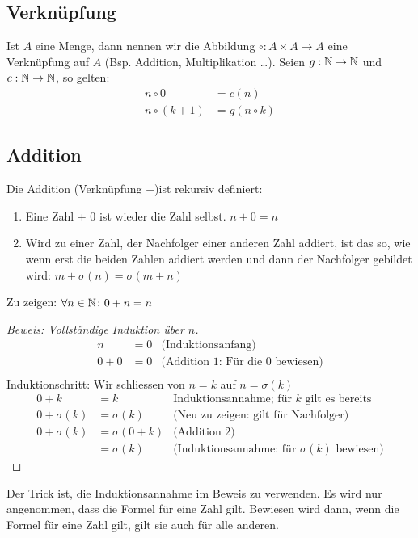 \subsection{Verknüpfung}
Ist $A$ eine Menge, dann nennen wir die Abbildung $\circ: A \times A \to A$ eine Verknüpfung auf $A$ (Bsp. Addition, Multiplikation \dots).
Seien $g: \mathbb{N} \to \mathbb{N}$ und $c: \mathbb{N} \to \mathbb{N}$, so gelten:
\begin{align*}
 n \circ 0& = c(n)\\
 n \circ (k + 1)& = g(n \circ k)
\end{align*}


\subsection{Addition}
Die Addition (Verknüpfung $+$)ist rekursiv definiert:
\begin{enumerate}
	\item Eine Zahl + 0 ist wieder die Zahl selbst. $n + 0 = n$
	\item Wird zu einer Zahl, der Nachfolger einer anderen Zahl addiert, ist das so, wie wenn
	erst die beiden Zahlen addiert werden und dann der Nachfolger gebildet wird: $m + \sigma(n) = \sigma(m + n)$
\end{enumerate}

Zu zeigen: $\forall n \in \mathbb{N} \colon 0 + n = n$
\begin{proof}[Beweis: Vollständige Induktion über $n$]
	\begin{align*}
		n	& = 0	& \mbox{(Induktionsanfang)}\\
		0 + 0& = 0	& \mbox{(Addition 1: Für die 0 bewiesen)}\\
	\end{align*}
	Induktionschritt: Wir schliessen von $n = k$ auf $n = \sigma(k)$
	\begin{align*}
		0 + k 		& = k	& \mbox{Induktionsannahme; für $k$ gilt es bereits}\\
		0 + \sigma(k) 	& = \sigma(k)		& \mbox{(Neu zu zeigen: gilt für Nachfolger)}\\
		0 + \sigma(k)	& = \sigma(0 + k)	& \mbox{(Addition 2)}\\
				& = \sigma(k)		& \mbox{(Induktionsannahme: für $\sigma(k)$ bewiesen)}
	\end{align*}
\end{proof}
Der Trick ist, die Induktionsannahme im Beweis zu verwenden. Es wird nur angenommen, dass die Formel für eine Zahl gilt.
Bewiesen wird dann, wenn die Formel für eine Zahl gilt, gilt sie auch für alle anderen.

